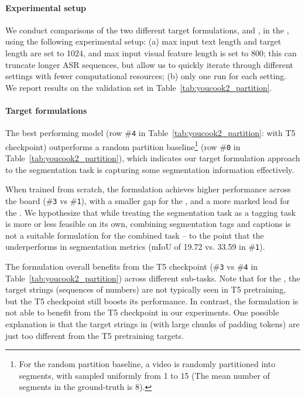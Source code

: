 \documentclass[11pt]{article}
\begin{document}
\paragraph{Experimental setup}
We conduct comparisons of the two different target formulations, \hardencoding and \offsetbased, in the \partitionsetting, using the following experimental setup: (a) max input text length and target length are set to 1024, and max input visual feature length is set to 800; this can truncate longer ASR sequences, but allow us to quickly iterate through different settings with fewer computational resources; 
(b) only one run for each setting.
We report results on the validation set in Table~\ref{tab:youcook2_partition}.

\paragraph{Target formulations}
The best performing model (row \#\texttt{4} in Table~\ref{tab:youcook2_partition}: \offsetbased with T5 checkpoint) outperforms a random partition baseline\footnote{For the random partition baseline, a video is randomly partitioned into  segments, with  sampled uniformly from 1 to 15 (The mean number of segments in the ground-truth is 8).} (row \#\texttt{0} in Table~\ref{tab:youcook2_partition}), 
which indicates our target formulation approach to the segmentation task is capturing some segmentation information effectively. 

When trained from scratch, the \offsetbased formulation achieves higher performance across the board (\#\texttt{3} vs \#\texttt{1}), with a smaller gap for the \segonly, and a more marked lead for the \segcap.
We hypothesize that while treating the segmentation task as a tagging task is more or less feasible on its own, combining segmentation tags and captions is not a suitable formulation for the combined task -- to the point that the \segcap underperforms \segonly in segmentation metrics (mIoU of 19.72 vs. 33.59 in \#\texttt{1}).

The \offsetbased formulation overall benefits from the T5 checkpoint (\#\texttt{3} vs \#\texttt{4} in Table~\ref{tab:youcook2_partition}) across different sub-tasks.  Note that for the \segonly, the target strings (sequences of numbers) are not typically seen in T5 pretraining, but the T5 checkpoint still boosts its performance.
In contrast, the \hardencoding formulation is not able to benefit from the T5 checkpoint in our experiments. One possible explanation is that the target strings in \hardencoding (with large chunks of padding tokens) are just too different from the T5 pretraining targets.  
\end{document}
